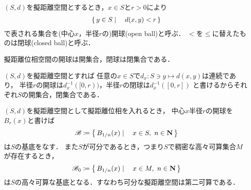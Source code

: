 	
	
	\begin{screen}
		\begin{dfn}[球]
			$(S,d)$を擬距離空間とするとき，$x \in S$と$r > 0$により
			\begin{align}
				\left\{\, y \in S \mid \quad d(x,y) < r\, \right\}
			\end{align}
			で表される集合を(中心$x$，半径$r$の)開球(open ball)と呼ぶ．
			$<$を$\leq$に替えたものは閉球(closed ball)と呼ぶ．
		\end{dfn}
	\end{screen}
	
	\begin{screen}
		\begin{thm}
		\label{thm:open_ball_is_open}
			擬距離位相空間の開球は開集合，閉球は閉集合である．
		\end{thm}
	\end{screen}
	
	\begin{prf}
		$(S,d)$を擬距離空間とすれば
		任意の$x \in S$で$d_x:S \ni y \longmapsto d(x,y)$は連続であり，
		半径$r$の開球は$d_x^{-1}([0,r))$，半径$r$の閉球は$d_x^{-1}([0,r])$
		と書けるからそれぞれ$S$の開集合，閉集合である．
		\QED
	\end{prf}
	
	\begin{screen}
		\begin{thm}[擬距離空間において開球全体は基底をなす]
		\label{thm:base_on_pseudometric_space}
			$(S,d)$を擬距離空間として擬距離位相を入れるとき，
			中心$x$半径$r$の開球を$B_r(x)$と書けば
			\begin{align}
				\mathscr{B} \coloneqq \left\{\, B_{1/n}(x) \mid \quad x \in S,\ n \in \mathbf{N}\, \right\}
				\label{eq:thm_base_on_pseudometric_space_1}
			\end{align}
			は$S$の基底をなす．
			また$S$が可分であるとき，つまり$S$で稠密な高々可算集合$M$が存在するとき，
			\begin{align}
				\mathscr{B}_0 \coloneqq \left\{\, B_{1/n}(x) \mid \quad x \in M,\ n \in \mathbf{N}\, \right\}
			\end{align}
			は$S$の高々可算な基底となる．すなわち可分な擬距離空間は第二可算である．
		\end{thm}
	\end{screen}
	
